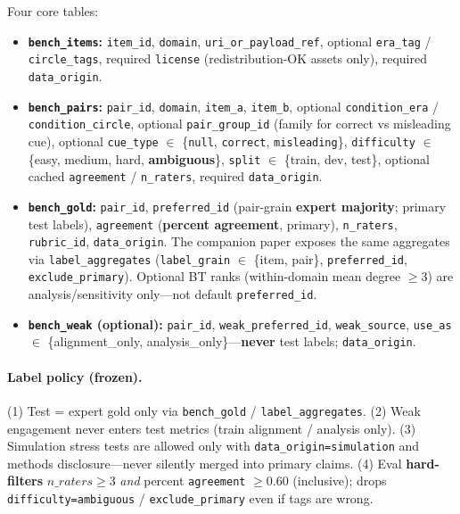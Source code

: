 \documentclass[11pt,a4paper]{article}
\begin{document}
Four core tables:

\begin{itemize}[leftmargin=*,itemsep=2pt]
  \item \textbf{\texttt{bench\_items}:} \texttt{item\_id}, \texttt{domain}, \texttt{uri\_or\_payload\_ref}, optional \texttt{era\_tag} / \texttt{circle\_tags}, required \texttt{license} (redistribution-OK assets only), required \texttt{data\_origin}.
  \item \textbf{\texttt{bench\_pairs}:} \texttt{pair\_id}, \texttt{domain}, \texttt{item\_a}, \texttt{item\_b}, optional \texttt{condition\_era} / \texttt{condition\_circle}, optional \texttt{pair\_group\_id} (family for correct vs misleading cue), optional \texttt{cue\_type} $\in$ \{\texttt{null}, \texttt{correct}, \texttt{misleading}\}, \texttt{difficulty} $\in$ \{easy, medium, hard, \textbf{ambiguous}\}, \texttt{split} $\in$ \{train, dev, test\}, optional cached \texttt{agreement} / \texttt{n\_raters}, required \texttt{data\_origin}.
  \item \textbf{\texttt{bench\_gold}:} \texttt{pair\_id}, \texttt{preferred\_id} (pair-grain \textbf{expert majority}; primary test labels), \texttt{agreement} (\textbf{percent agreement}, primary), \texttt{n\_raters}, \texttt{rubric\_id}, \texttt{data\_origin}. The companion paper exposes the same aggregates via \texttt{label\_aggregates} (\texttt{label\_grain} $\in$ \{item, pair\}, \texttt{preferred\_id}, \texttt{exclude\_primary}). Optional BT ranks (within-domain mean degree $\ge 3$) are analysis/sensitivity only---not default \texttt{preferred\_id}.
  \item \textbf{\texttt{bench\_weak} (optional):} \texttt{pair\_id}, \texttt{weak\_preferred\_id}, \texttt{weak\_source}, \texttt{use\_as} $\in$ \{alignment\_only, analysis\_only\}---\textbf{never} test labels; \texttt{data\_origin}.
\end{itemize}

\paragraph{Label policy (frozen).} (1) Test = expert gold only via \texttt{bench\_gold} / \texttt{label\_aggregates}. (2) Weak engagement never enters test metrics (train alignment / analysis only). (3) Simulation stress tests are allowed only with \texttt{data\_origin=simulation} and methods disclosure---never silently merged into primary claims. (4) Eval \textbf{hard-filters} $n\_raters \ge 3$ \emph{and} percent \texttt{agreement} $\ge 0.60$ (inclusive); drops \texttt{difficulty=ambiguous} / \texttt{exclude\_primary} even if tags are wrong.
\end{document}
